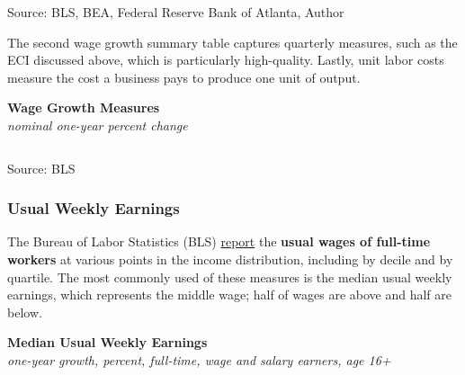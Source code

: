 \documentclass{report}
\newcommand{\tbllink}[1]{\href{https://raw.githubusercontent.com/bdecon/US-chartbook/master/chartbook/data/#1}{\faTable}}
\begin{document}
{\begin{minipage}{1.0\textwidth}
\footnotesize{Source: BLS, BEA, Federal Reserve Bank of Atlanta, Author} \hfill \tbllink{wages_yy_monthly.csv} 
\end{minipage}
\newpage
\vspace*{-10mm}      

\begin{minipage}{1.0\textwidth}
\small The second wage growth summary table captures quarterly measures, such as the ECI discussed above, which is particularly high-quality. Lastly, unit labor costs measure the cost a business pays to produce one unit of output. 
\vspace{0.5mm}

\normalsize \textbf{Wage Growth Measures}\\
\footnotesize{\textit{nominal one-year percent change}}
\vspace*{-8mm}

 \setlength{\tabcolsep}{3.0pt} \color{black!90}
{\renewcommand{\arraystretch}{1.5}
\hspace{-1mm} \begin{tabular}{p{42mm} R{7.2mm} R{7.2mm} R{7.2mm} R{7.2mm} R{7.2mm} 
		R{7.2mm} R{7.2mm} R{7.2mm} }
 \hline
	\end{tabular}}
	\vspace{-2.5mm}
				
\footnotesize{Source: BLS} \hfill  \tbllink{wages_yy_quarterly.csv} 
\vspace{1mm}

\subsubsection*{Usual Weekly Earnings}
\vspace*{-1mm}

\small The Bureau of Labor Statistics (BLS) \href{https://www.bls.gov/webapps/legacy/cpswktab5.htm}{report} the \textbf{usual wages of full-time workers} at various points in the income distribution, including by decile and by quartile. The most commonly used of these measures is the median usual weekly earnings, which represents the middle wage; half of wages are above and half are below.


\vspace{0.5mm}

\normalsize \textbf{Median Usual Weekly Earnings}\\
\footnotesize{\textit{one-year growth, percent, full-time, wage and salary earners, age 16+}}
\vspace{3.6cm}


\end{minipage}}
\end{document}
